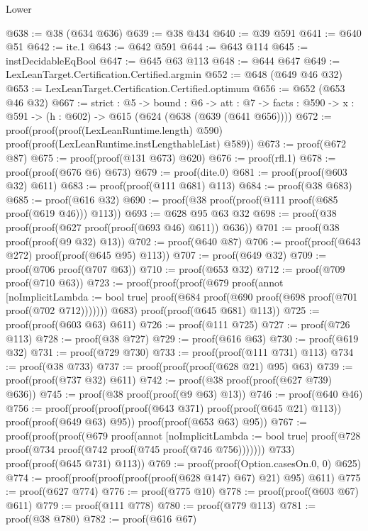 \begin{lexlean}{Lower}
\begin{coremodule}
@638 := @38 (@634 @636)
@639 := @38 @434
@640 := @39 @591
@641 := @640 @51
@642 := ite.{1}
@643 := @642 @591
@644 := @643 @114
@645 := instDecidableEqBool
@647 := @645 @63 @113
@648 := @644 @647
@649 := LexLeanTarget.Certification.Certified.argmin
@652 := @648 (@649 @46 @32)
@653 := LexLeanTarget.Certification.Certified.optimum
@656 := @652 (@653 @46 @32)
@667 := {strict : @5} ->
  {bound : @6} ->
  {att : @7} -> {facts : @590} -> {x : @591} -> (h : @602) -> @615 (@624 (@638 (@639 (@641 @656))))
@672 := proof(proof(proof(LexLeanRuntime.length) @590)
      proof(proof(LexLeanRuntime.instLengthableList) @589))
@673 := proof(@672 @87)
@675 := proof(proof(@131 @673) @620)
@676 := proof(rfl.{1})
@678 := proof(proof(@676 @6) @673)
@679 := proof(dite.{0})
@681 := proof(proof(@603 @32) @611)
@683 := proof(proof(@111 @681) @113)
@684 := proof(@38 @683)
@685 := proof(@616 @32)
@690 := proof(@38 proof(proof(@111 proof(@685 proof(@619 @46))) @113))
@693 := @628 @95 @63 @32
@698 := proof(@38 proof(proof(@627 proof(proof(@693 @46) @611)) @636))
@701 := proof(@38 proof(proof(@9 @32) @13))
@702 := proof(@640 @87)
@706 := proof(proof(@643 @272) proof(proof(@645 @95) @113))
@707 := proof(@649 @32)
@709 := proof(@706 proof(@707 @63))
@710 := proof(@653 @32)
@712 := proof(@709 proof(@710 @63))
@723 := proof(proof(proof(@679
          proof(annot [noImplicitLambda := bool true]
            proof(@684 proof(@690 proof(@698 proof(@701 proof(@702 @712)))))))
        @683)
      proof(proof(@645 @681) @113))
@725 := proof(proof(@603 @63) @611)
@726 := proof(@111 @725)
@727 := proof(@726 @113)
@728 := proof(@38 @727)
@729 := proof(@616 @63)
@730 := proof(@619 @32)
@731 := proof(@729 @730)
@733 := proof(proof(@111 @731) @113)
@734 := proof(@38 @733)
@737 := proof(proof(proof(@628 @21) @95) @63)
@739 := proof(proof(@737 @32) @611)
@742 := proof(@38 proof(proof(@627 @739) @636))
@745 := proof(@38 proof(proof(@9 @63) @13))
@746 := proof(@640 @46)
@756 := proof(proof(proof(proof(@643 @371) proof(proof(@645 @21) @113)) proof(proof(@649 @63) @95))
      proof(proof(@653 @63) @95))
@767 := proof(proof(proof(@679
          proof(annot [noImplicitLambda := bool true]
            proof(@728 proof(@734 proof(@742 proof(@745 proof(@746 @756)))))))
        @733)
      proof(proof(@645 @731) @113))
@769 := proof(proof(Option.casesOn.{0, 0}) @625)
@774 := proof(proof(proof(proof(proof(@628 @147) @67) @21) @95) @611)
@775 := proof(@627 @774)
@776 := proof(@775 @10)
@778 := proof(proof(@603 @67) @611)
@779 := proof(@111 @778)
@780 := proof(@779 @113)
@781 := proof(@38 @780)
@782 := proof(@616 @67)

\end{coremodule}
\end{lexlean}
